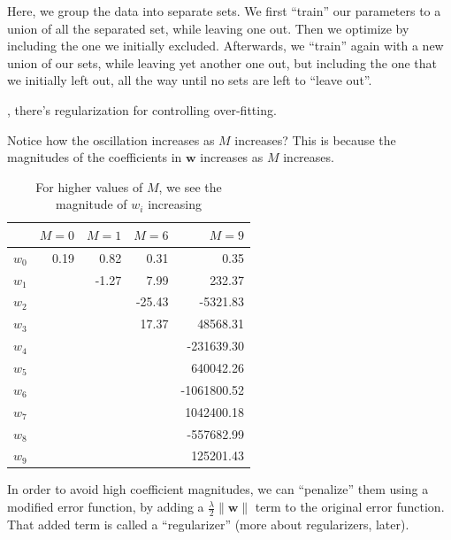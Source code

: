 \documentclass{tufte-handout}
\begin{document}
Here, we group the data into separate sets. We first ``train'' our parameters to
a union of all the separated set, while leaving one out. Then we optimize by
including the one we initially excluded. Afterwards, we ``train'' again with a
new union of our sets, while leaving yet another one out, but including the one
that we initially left out, all the way until no sets are left to ``leave out''.

, there's regularization for controlling over-fitting.

Notice how the oscillation increases as $M$ increases? This is because the
magnitudes of the coefficients in $\mathbf{w}$ increases as $M$ increases.

\begin{table}[h]
  \begin{center}
    \begin{tabular}{lrrrr}
      \toprule
       & $M = 0$ & $M = 1$ & $M = 6$ & $M = 9$ \\
      \midrule
      $w_0$ & 0.19 &  0.82 &   0.31 &        0.35 \\
      $w_1$ &      & -1.27 &   7.99 &      232.37 \\
      $w_2$ &      &       & -25.43 &    -5321.83 \\
      $w_3$ &      &       &  17.37 &    48568.31 \\
      $w_4$ &      &       &        &  -231639.30 \\
      $w_5$ &      &       &        &   640042.26 \\
      $w_6$ &      &       &        & -1061800.52 \\
      $w_7$ &      &       &        &  1042400.18 \\
      $w_8$ &      &       &        &  -557682.99 \\
      $w_9$ &      &       &        &   125201.43 \\
      \bottomrule
    \end{tabular}
  \end{center}
  \caption{For higher values of $M$, we see the magnitude of $w_i$ increasing}
  \label{tab:font-sizes}
\end{table}

In order to avoid high coefficient magnitudes, we can ``penalize'' them using
a modified error function, by adding a $\frac{\lambda}{2}\|\mathbf{w}\|$ term
to the original error function. That added term is called a ``regularizer''
(more about regularizers, later).
\end{document}
